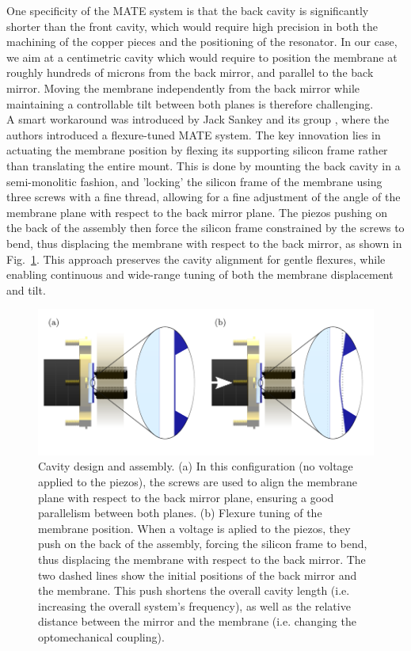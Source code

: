 One specificity of the MATE system is that the back cavity is significantly shorter than the front cavity, which would require high precision in both the machining of the copper pieces and the positioning of the resonator. In our case, we aim at a centimetric cavity which would require to position the membrane at roughly hundreds of microns from the back mirror, and parallel to the back mirror. Moving the membrane independently from the back mirror while maintaining a controllable tilt between both planes is therefore challenging. \\


A smart workaround was introduced by Jack Sankey and its group \cite{Sankey2010}, where the authors introduced a flexure-tuned MATE system. The key innovation lies in actuating the membrane position by flexing its supporting silicon frame rather than translating the entire mount. This is done by mounting the back cavity in a semi-monolitic fashion, and 'locking' the silicon frame of the membrane using three screws with a fine thread, allowing for a fine adjustment of the angle of the membrane plane with respect to the back mirror plane. The piezos pushing on the back of the assembly then force the silicon frame constrained by the screws to bend, thus displacing the membrane with respect to the back mirror, as shown in Fig.~\ref{fig:flexure tune}. 
This approach preserves the cavity alignment for gentle flexures, while enabling continuous and wide-range tuning of both the membrane displacement and tilt. 


\begin{figure}[H]
    \centering  
    \includegraphics[width=\textwidth]{./chap5/fig/flexure tune.pdf}
    \caption{Cavity design and assembly. (a) In this configuration (no voltage applied to the piezos), the screws are used to align the membrane plane with respect to the back mirror plane, ensuring a good parallelism between both planes. (b) Flexure tuning of the membrane position. When a voltage is aplied to the piezos, they push on the back of the assembly, forcing the silicon frame to bend, thus displacing the membrane with respect to the back mirror. The two dashed lines show the initial positions of the back mirror and the membrane. This push shortens the overall cavity length (i.e. increasing the overall system's frequency), as well as the relative distance between the mirror and the membrane (i.e. changing the optomechanical coupling). }
    \label{fig:flexure tune}
\end{figure}


